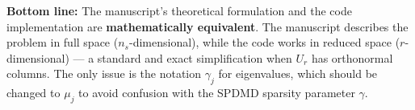 \documentclass[11pt,a4paper]{article}
\begin{document}
\medskip\noindent
\textbf{Bottom line:} The manuscript's theoretical formulation and the code implementation are \textbf{mathematically equivalent}.  The manuscript describes the problem in full space ($n_s$-dimensional), while the code works in reduced space ($r$-dimensional) — a standard and exact simplification when $U_r$ has orthonormal columns.  The only issue is the notation $\gamma_j$ for eigenvalues, which should be changed to $\mu_j$ to avoid confusion with the SPDMD sparsity parameter $\gamma$.
\end{document}
